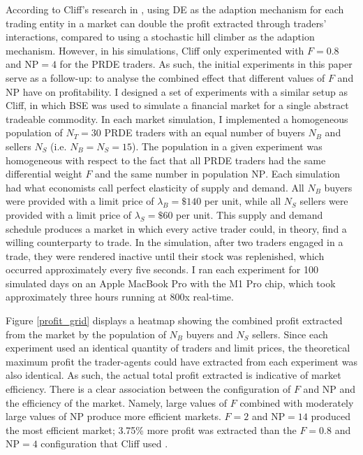 \documentclass[a4paper,twoside]{article}
\begin{document}
According to Cliff's research in \cite{PRDE}, using DE as the adaption mechanism for each trading entity in a market can double the profit extracted through traders' interactions, compared to using a stochastic hill climber as the adaption mechanism.
However, in his simulations, Cliff only experimented with $F=0.8$ and $\mathrm{NP}=4$ for the PRDE traders.
As such, the initial experiments in this paper serve as a follow-up: to analyse the combined effect that different values of $F$ and $\mathrm{NP}$ have on profitability.
I designed a set of experiments with a similar setup as Cliff, in which BSE was used to simulate a financial market for a single abstract tradeable commodity.
In each market simulation, I implemented a homogeneous population of $N_T=30$ PRDE traders with an equal number of buyers $N_B$ and sellers $N_S$ (i.e. $N_B=N_S=15$).
The population in a given experiment was homogeneous with respect to the fact that all PRDE traders had the same differential weight $F$ and the same number in population $\mathrm{NP}$.
Each simulation had what economists call perfect elasticity of supply and demand.
All $N_B$ buyers were provided with a limit price of $\lambda_B=\$140$ per unit, while all $N_S$ sellers were provided with a limit price of $\lambda_S=\$60$ per unit.
This supply and demand schedule produces a market in which every active trader could, in theory, find a willing counterparty to trade.
In the simulation, after two traders engaged in a trade, they were rendered inactive until their stock was replenished, which occurred approximately every five seconds.
I ran each experiment for 100 simulated days on an Apple MacBook Pro with the M1 Pro chip, which took approximately three hours running at 800x real-time.

Figure \ref{profit_grid} displays a heatmap showing the combined profit extracted from the market by the population of $N_B$ buyers and $N_S$ sellers.
Since each experiment used an identical quantity of traders and limit prices, the theoretical maximum profit the trader-agents could have extracted from each experiment was also identical.
As such, the actual total profit extracted is indicative of market efficiency.
There is a clear association between the configuration of $F$ and $\mathrm{NP}$ and the efficiency of the market.
Namely, large values of $F$ combined with moderately large values of $\mathrm{NP}$ produce more efficient markets.
$F=2$ and $\mathrm{NP}=14$ produced the most efficient market; 3.75\% more profit was extracted than the $F=0.8$ and $\mathrm{NP}=4$ configuration that Cliff used \cite{PRDE}.
\end{document}
